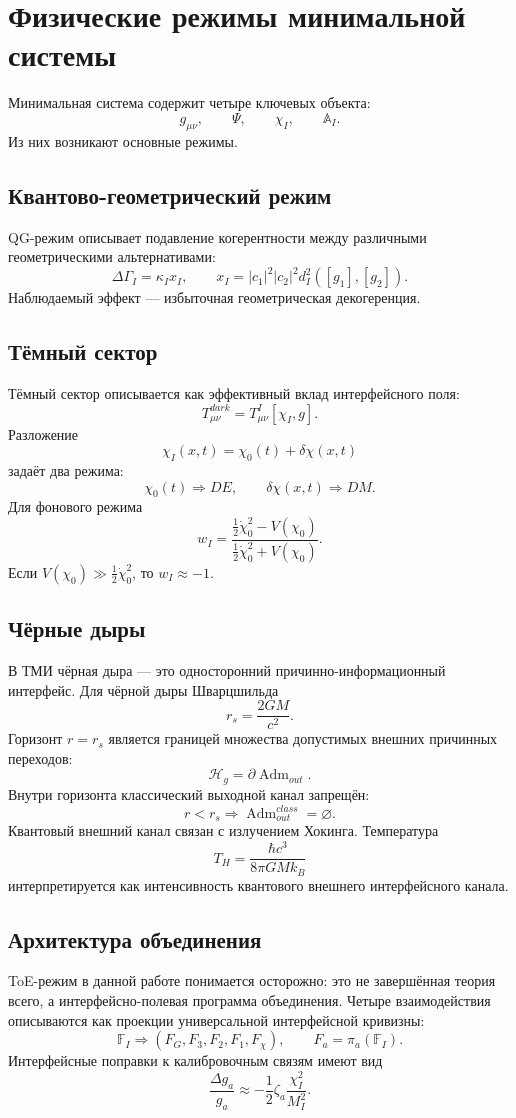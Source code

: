 \documentclass[12pt,a4paper]{article}
\DeclareMathOperator{\Adm}{Adm}
\newcommand{\Acal}{\mathbb A_I}
\newcommand{\Fcal}{\mathbb F_I}
\begin{document}
\section{Физические режимы минимальной системы}
Минимальная система содержит четыре ключевых объекта:
\[
\boxed{g_{\mu\nu},\qquad\Psi,
\qquad\chi_I,
\qquad\Acal.}
\]
Из них возникают основные режимы.

\subsection{Квантово-геометрический режим}
QG-режим описывает подавление когерентности между различными геометрическими альтернативами:
\[
\boxed{\Delta\Gamma_I=\kappa_Ix_I,
\qquad x_I=|c_1|^2|c_2|^2d_I^2([g_1],[g_2]).}
\]
Наблюдаемый эффект — избыточная геометрическая декогеренция.

\subsection{Тёмный сектор}
Тёмный сектор описывается как эффективный вклад интерфейсного поля:
\[
\boxed{T_{\mu\nu}^{dark}=T_{\mu\nu}^{I}[\chi_I,g].}
\]
Разложение
\[
\boxed{\chi_I(x,t)=\chi_0(t)+\delta\chi(x,t)}
\]
задаёт два режима:
\[
\boxed{\chi_0(t)\Rightarrow DE,
\qquad \delta\chi(x,t)\Rightarrow DM.}
\]
Для фонового режима
\[
\boxed{w_I=\frac{\frac12\dot\chi_0^2-V(\chi_0)}{\frac12\dot\chi_0^2+V(\chi_0)}.}
\]
Если $V(\chi_0)\gg\frac12\dot\chi_0^2$, то $w_I\approx-1$.

\subsection{Чёрные дыры}
В ТМИ чёрная дыра — это односторонний причинно-информационный интерфейс. Для чёрной дыры Шварцшильда
\[
\boxed{r_s=\frac{2GM}{c^2}.}
\]
Горизонт $r=r_s$ является границей множества допустимых внешних причинных переходов:
\[
\boxed{\mathcal H_g=\partial\Adm_{out}.}
\]
Внутри горизонта классический выходной канал запрещён:
\[
\boxed{r<r_s\Rightarrow\Adm_{out}^{class}=\varnothing.}
\]
Квантовый внешний канал связан с излучением Хокинга. Температура
\[
\boxed{T_H=\frac{\hbar c^3}{8\pi GMk_B}}
\]
интерпретируется как интенсивность квантового внешнего интерфейсного канала.

\subsection{Архитектура объединения}
ToE-режим в данной работе понимается осторожно: это не завершённая теория всего, а интерфейсно-полевая программа объединения. Четыре взаимодействия описываются как проекции универсальной интерфейсной кривизны:
\[
\boxed{\Fcal\Rightarrow(F_G,F_3,F_2,F_1,F_\chi),
\qquad F_a=\pi_a(\Fcal).}
\]
Интерфейсные поправки к калибровочным связям имеют вид
\[
\boxed{\frac{\Delta g_a}{g_a}\approx-\frac12\zeta_a\frac{\chi_I^2}{M_I^2}.}
\]
\end{document}
